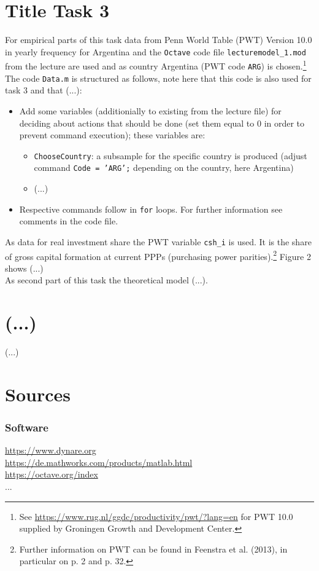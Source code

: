 \documentclass[12pt,a4paper,notitlepage]{article}
\numberwithin{equation}{section}
\begin{document}
\section{Title Task 3}
For empirical parts of this task data from Penn World Table (PWT) Version 10.0 in yearly frequency for Argentina and the \texttt{Octave} code file \texttt{lecturemodel\_1.mod} from the lecture are used and as country Argentina (PWT code \texttt{ARG}) is chosen.\footnote{See \url{https://www.rug.nl/ggdc/productivity/pwt/?lang=en} for PWT 10.0 supplied by Groningen Growth and Development Center.} The code \texttt{Data.m} is structured as follows, note here that this code is also used for task 3 and that (...):\\
\begin{itemize}
	\item Add some variables (additionially to existing from the lecture file) for deciding about actions that should be done (set them equal to 0 in order to prevent command execution); these variables are:
	\begin{itemize}
		\item \texttt{ChooseCountry}: a subsample for the specific country is produced (adjust command \texttt{Code = 'ARG';} depending on the country, here Argentina) 
		\item (...)
	\end{itemize}
		\item Respective commands follow in \texttt{for} loops. For further information see comments in the code file.
\end{itemize}
As data for real investment share the PWT variable \texttt{csh\_i} is used. It is the share of gross capital formation at current PPPs (purchasing power parities).\footnote{Further information on PWT can be found in Feenstra et al. (2013), in particular on p. 2 and p. 32.} Figure 2 shows (...)\\
As second part of this task the theoretical model (...).

\section{(...)}
(...)

\newpage

\section{Sources}
\subsubsection*{Software}
	\url{https://www.dynare.org} \\
	\url{https://de.mathworks.com/products/matlab.html} \\
	\url {https://octave.org/index}\\
 ...
\end{document}
